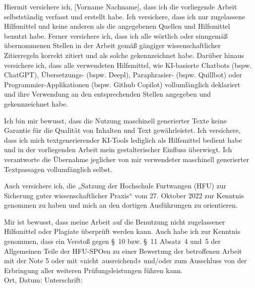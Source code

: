 \label{affidavit}

Hiermit versichere ich, [Vorname Nachname], dass ich die vorliegende
Arbeit selbstständig verfasst und erstellt habe. Ich versichere, dass
ich nur zugelassene Hilfsmittel und keine anderen als die angegebenen
Quellen und Hilfsmittel benutzt habe. Ferner versichere ich, dass ich
alle wörtlich oder sinngemäß übernommenen Stellen in der Arbeit gemäß
gängiger wissenschaftlicher Zitierregeln korrekt zitiert und als solche
gekennzeichnet habe. Darüber hinaus versichere ich, dass alle
verwendeten Hilfsmittel, wie KI-basierte Chatbots (bspw. ChatGPT),
Übersetzungs- (bspw. Deepl), Paraphrasier- (bspw. Quillbot) oder
Programmier-Applikationen (bspw. Github Copilot) vollumfänglich
deklariert und ihre Verwendung an den entsprechenden Stellen angegeben
und gekennzeichnet habe.

Ich bin mir bewusst, dass die Nutzung maschinell generierter Texte keine
Garantie für die Qualität von Inhalten und Text gewährleistet. Ich
versichere, dass ich mich textgenerierender KI-Tools lediglich als
Hilfsmittel bedient habe und in der vorliegenden Arbeit mein
gestalterischer Einfluss überwiegt. Ich verantworte die Übernahme
jeglicher von mir verwendeter maschinell generierter Textpassagen
vollumfänglich selbst.

Auch versichere ich, die „Satzung der Hochschule Furtwangen (HFU) zur
Sicherung guter wissenschaftlicher Praxis`` vom 27. Oktober 2022 zur
Kenntnis genommen zu haben und mich an den dortigen Ausführungen zu
orientieren.

Mir ist bewusst, dass meine Arbeit auf die Benutzung nicht zugelassener
Hilfsmittel oder Plagiate überprüft werden kann. Auch habe ich zur
Kenntnis genommen, dass ein Verstoß gegen §~10 bzw. §~11 Absatz~4 und~5
der Allgemeinen Teile der HFU-SPOen zu einer Bewertung der betroffenen
Arbeit mit der Note 5 oder mit «nicht~ausreichend» und/oder zum
Ausschluss von der Erbringung aller weiteren Prüfungsleistungen führen
kann.
\\[1.5cm]
Ort, Datum:	\hrulefill\enspace Unterschrift: \hrulefill